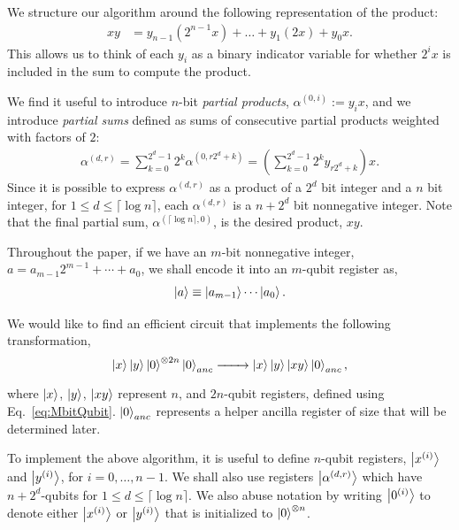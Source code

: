 \documentclass[reprint,amsmath,amssymb,aps,pra]{revtex4-2}
\begin{document}
We structure our algorithm around the following representation of the product:
\begin{align}
    xy  &= y_{n-1}(2^{n-1}x)+\dots+y_1(2x)+y_0x. \label{Eq1}
\end{align}
This allows us to think of each $y_i$ as a binary indicator variable for whether
$2^ix$ is included in the sum to compute the product. 

We find it useful to introduce $n$-bit \emph{partial products}, $\alpha^{(0,i)}
:= y_ix$, and we introduce \emph{partial sums} defined as sums of consecutive
partial products weighted with factors of $2$:
\begin{align}
\alpha^{(d,r)} 
= \sum_{k=0}^{2^d-1} 2^k \alpha^{(0,r2^d + k)}
= \left(\sum_{k=0}^{2^d-1} 2^k y_{r2^d + k}\right) x.
\label{eq:DefnAlpha}
\end{align}
Since it is possible to express $\alpha^{(d,r)}$ as a product of a $2^d$ bit
integer and a $n$ bit integer, for $1 \le d \le \lceil \log{n}\rceil$, each
$\alpha^{(d,r)}$ is a $n+2^d$ bit nonnegative integer.
%
Note that the final partial sum, $\alpha^{(\lceil \log n \rceil, 0)}$,
is the desired product, $xy$.


Throughout the paper, if we have an $m$-bit nonnegative integer, $a = a_{m-1}2^{m-1}+\cdots+a_0$, we shall
encode it into an $m$-qubit register as,
\begin{align}
\ket{a} \equiv 
\ket{a_{m-1}} \cdots \ket{a_{0}}. \label{eq:MbitQubit}
\end{align}

We would like to find an efficient circuit that implements the following transformation,
\begin{align}
    \ket{x}\ket{y}\ket{0}^{\otimes 2n}
    \ket{0}_{anc} \xrightarrow[\qquad]{} \ket{x}\ket{y}\ket{xy}\ket{0}_{anc},
    \label{eq:Desired}
\end{align}
where $\ket{x}$, $\ket{y}$, $\ket{xy}$ represent $n$, and $2n$-qubit
registers, defined using 
Eq.~\eqref{eq:MbitQubit}.
$\ket{0}_{anc}$ represents a helper ancilla register of size that will be determined later.

To implement the above algorithm, it is useful to 
define $n$-qubit registers, $\ket{x^{(i)}}$ and $\ket{y^{(i)}}$, for $i=0,\ldots,n-1$.
We shall also use registers $\ket{\alpha^{(d,r)}}$ which have $n+2^d$-qubits for $1 \le d \le \lceil\log n\rceil$.
We also abuse notation by writing $\ket{0^{(i)}}$ to denote either $\ket{x^{(i)}}$ or $\ket{y^{(i)}}$ that is initialized to $\ket{0}^{\otimes n}$.
\end{document}
